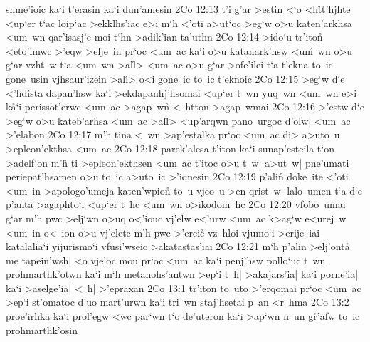 shme'ioic
ka`i
t'erasin
ka`i
dun'amesin\bibvsend
\vs 2Co 12:13
t'i
g'ar
>estin
<`o
<h\r{t}t'hjhte
<up`er
t`ac
loip`ac
>ekklhs'iac
e>i
m`h
<'oti
a>ut`oc
>eg`w
o>u
katen'arkhsa
<um~wn
qar'isasj'e
moi
t`hn
>adik'ian
ta'uthn\bibvsend
\vs 2Co 12:14
>ido`u
tr'ito\r{n}
<eto'imwc
>'eqw
>elje~in
pr`oc
<um~ac
ka`i
o>u
katanark'hsw
<u\r{m}~wn
o>u
g`ar
vzht~w
t`a
<um~wn
>al\r{l}>
<um~ac
o>u
g`ar
>ofe'ilei
t`a
t'ekna
to~ic
gone~usin
vjhsaur'izein
>al\r{l}>
o<i
gone~ic
to~ic
t'eknoic\bibvsend
\vs 2Co 12:15
>eg`w
d`e
<'hdista
dapan'hsw
ka`i
>ekdapanhj'hsomai
<up`er
t~wn
yuq~wn
<um~wn
e>i
k\r{a}`i
perissot'erwc
<um~ac
>agap~wn\r{}
<~htton
>agap~wmai\bibvsend
\vs 2Co 12:16
>'estw
d`e
>eg`w
o>u
kateb'arhsa
<um~ac
>al\r{l}>
<up'arqwn
pano~urgoc
d'olw|
<um~ac
>'elabon\bibvsend
\vs 2Co 12:17
m'h
tina
<~wn
>ap'estalka
pr`oc
<um~ac
di>
a>uto~u
>epleon'ekthsa
<um~ac\bibvsend
\vs 2Co 12:18
parek'alesa
t'iton
ka`i
sunap'esteila
t`on
>adelf`on
m'h\r{}
ti
>epleon'ekthsen
<um~ac
t'itoc
o>u
t~w|
a>ut~w|
pne'umati
periepat'hsamen
o>u
to~ic
a>uto~ic
>'iqnesin\bibvsend
\vs 2Co 12:19
p'ali\r{n}
doke~ite
<'oti
<um~in
>apologo'umeja
katen'wpion\r{}
to~u
vjeo~u
>en
qrist~w|
lalo~umen
t`a
d`e
p'anta
>agaphto`i
<up`er
t~hc
<um~wn
o>ikodom~hc\bibvsend
\vs 2Co 12:20
vfobo~umai
g`ar
m'h
pwc
>elj`wn
o>uq
o<'iouc
vj'elw
e<'urw
<um~ac
k>ag`w
e<urej~w
<um~in
o<~ion
o>u
vj'elete
m'h
pwc
>'ereic\r{}
vz~hloi
vjumo`i
>erije~iai
katalalia`i
yijurismo`i
vfusi'wseic
>akatastas'iai\bibvsend
\vs 2Co 12:21
m`h
p'alin
>elj'onta\r{}
me
tapein'wsh|
<o
vje'oc
mou
pr`oc
<um~ac
ka`i
penj'hsw
pollo`uc
t~wn
prohmarthk'otwn
ka`i
m`h
metanohs'antwn
>ep`i
t~h|
>akajars'ia|
ka`i
porne'ia|
ka`i
>aselge'ia|
<~h|
>'epraxan\bibvsend
\vs 2Co 13:1
tr'iton
to~uto
>'erqomai
pr`oc
<um~ac
>ep`i
st'omatoc
d'uo
mart'urwn
ka`i
tri~wn
staj'hsetai
p~an
<r~hma\bibvsend
\vs 2Co 13:2
proe'irhka
ka`i
prol'egw
<wc
par`wn
t`o
de'uteron
ka`i
>ap`wn
n~un
g\r{r}'afw
to~ic
prohmarthk'osin
